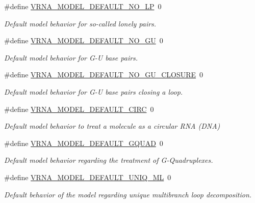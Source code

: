 \begin{DoxyCompactItemize}
\#define \hyperlink{group__model__details_gab72462726dd60ed0d43339bbf7ee08ad}{V\+R\+N\+A\+\_\+\+M\+O\+D\+E\+L\+\_\+\+D\+E\+F\+A\+U\+L\+T\+\_\+\+N\+O\+\_\+\+L\+P}~0
\begin{DoxyCompactList}\small\item\em Default model behavior for so-\/called \textquotesingle{}lonely pairs\textquotesingle{}. \end{DoxyCompactList}\item 
\#define \hyperlink{group__model__details_ga34702f7d14d38b877ba8e475281e97e2}{V\+R\+N\+A\+\_\+\+M\+O\+D\+E\+L\+\_\+\+D\+E\+F\+A\+U\+L\+T\+\_\+\+N\+O\+\_\+\+G\+U}~0
\begin{DoxyCompactList}\small\item\em Default model behavior for G-\/\+U base pairs. \end{DoxyCompactList}\item 
\#define \hyperlink{group__model__details_ga5308de46faaca4b9fd16045864901ee7}{V\+R\+N\+A\+\_\+\+M\+O\+D\+E\+L\+\_\+\+D\+E\+F\+A\+U\+L\+T\+\_\+\+N\+O\+\_\+\+G\+U\+\_\+\+C\+L\+O\+S\+U\+R\+E}~0
\begin{DoxyCompactList}\small\item\em Default model behavior for G-\/\+U base pairs closing a loop. \end{DoxyCompactList}\item 
\#define \hyperlink{group__model__details_ga22059033db7bcd875c51fec32425490a}{V\+R\+N\+A\+\_\+\+M\+O\+D\+E\+L\+\_\+\+D\+E\+F\+A\+U\+L\+T\+\_\+\+C\+I\+R\+C}~0
\begin{DoxyCompactList}\small\item\em Default model behavior to treat a molecule as a circular R\+N\+A (D\+N\+A) \end{DoxyCompactList}\item 
\#define \hyperlink{group__model__details_ga793ed812e86f43799b14b2deee917f23}{V\+R\+N\+A\+\_\+\+M\+O\+D\+E\+L\+\_\+\+D\+E\+F\+A\+U\+L\+T\+\_\+\+G\+Q\+U\+A\+D}~0
\begin{DoxyCompactList}\small\item\em Default model behavior regarding the treatment of G-\/\+Quadruplexes. \end{DoxyCompactList}\item 
\#define \hyperlink{group__model__details_ga63f6006a02ba2d89148441f406c309e7}{V\+R\+N\+A\+\_\+\+M\+O\+D\+E\+L\+\_\+\+D\+E\+F\+A\+U\+L\+T\+\_\+\+U\+N\+I\+Q\+\_\+\+M\+L}~0
\begin{DoxyCompactList}\small\item\em Default behavior of the model regarding unique multibranch loop decomposition. \end{DoxyCompactList}\item 

\end{DoxyCompactItemize}
